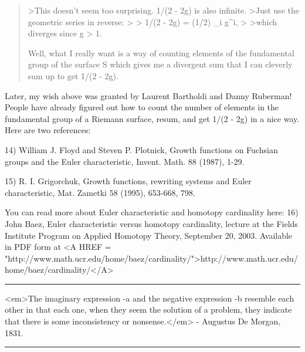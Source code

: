 \begin{quote}
>This doesn't seem too surprising.  1/(2 - 2g) is also infinite.
>Just use the geometric series in reverse:
>
>                  1/(2 - 2g) = (1/2) \sum_{i} g^{i}, 
>
>which diverges since g > 1.
$$
    

Well, what I really want is a way of counting elements of the fundamental
group of the surface S which gives me a divergent sum that I can cleverly
sum up to get 1/(2 - 2g).  

\end{quote}

Later, my wish above was granted by Laurent Bartholdi and Danny Ruberman!
People have already figured out how to count the number of elements
in the fundamental group of a Riemann surface, resum, and get 1/(2 - 2g) 
in a nice way.  Here are two references:

14) William J. Floyd and Steven P. Plotnick, Growth functions on 
Fuchsian groups and the Euler characteristic, Invent. Math. 88
(1987), 1-29.

15) R. I. Grigorchuk, Growth functions, rewriting systems and Euler 
characteristic, Mat. Zametki 58 (1995), 653-668, 798.

You can read more about Euler characteristic and homotopy cardinality
here:
16) John Baez, Euler characteristic versus homotopy cardinality, 
lecture at the Fields Institute Program on Applied Homotopy Theory, 
September 20, 2003.  Available in PDF form at <A HREF = "http://www.math.ucr.edu/home/baez/cardinality/">http://www.math.ucr.edu/home/baez/cardinality/</A>






 \par\noindent\rule{\textwidth}{0.4pt}

<em>The imaginary expression \sqrt -a and the negative expression
-b resemble each other in that each one, when they seem the solution
of a problem, they indicate that there is some inconsistency or
nonsense.</em> - Augustus De Morgan, 1831.
\par\noindent\rule{\textwidth}{0.4pt}

